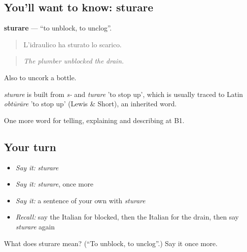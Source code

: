 \subsection*{You'll want to know: sturare}
\textbf{sturare} — \textquotedblleft{}to unblock, to unclog\textquotedblright{}.

\begin{quote}
L'idraulico ha sturato lo scarico.
\end{quote}

\begin{quote}
\emph{The plumber unblocked the drain.}
\end{quote}

Also to uncork a bottle.

\begin{cousinweb}
\emph{sturare} is built from \emph{s-} and \emph{turare} 'to stop up', which is usually traced to Latin \emph{obtūrāre} 'to stop up' (Lewis \& Short), an inherited word.
\end{cousinweb}

\begin{grammarlens}[title={What you've built}]
One more word for telling, explaining and describing at B1.
\end{grammarlens}

\subsection*{Your turn}
\begin{itemize}
\raggedright
  \item \emph{Say it:} \emph{sturare}
  \item \emph{Say it:} \emph{sturare}, once more
  \item \emph{Say it:} a sentence of your own with \emph{sturare}
  \item \emph{Recall:} say the Italian for blocked, then the Italian for the drain, then say \emph{sturare} again
\end{itemize}

\begin{tcolorbox}[breakable,colback=teal!4,colframe=teal!35!black,title={Before you move on}]
What does sturare mean? (\textquotedblleft{}To unblock, to unclog\textquotedblright{}.) Say it once more.
\end{tcolorbox}

